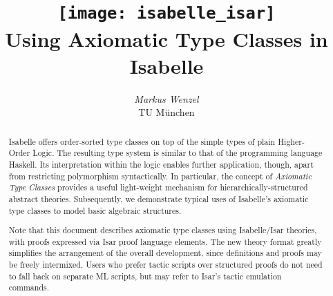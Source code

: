 \documentclass[12pt,a4paper,fleqn]{report}
\title{\texttt{[image: isabelle\_isar]}
  \\[4ex] Using Axiomatic Type Classes in Isabelle}
\author{\emph{Markus Wenzel} \\ TU M\"unchen}
\begin{document}
\underscoreoff

\maketitle 

\begin{abstract}
  Isabelle offers order-sorted type classes on top of the simple types of
  plain Higher-Order Logic.  The resulting type system is similar to that of
  the programming language Haskell.  Its interpretation within the logic
  enables further application, though, apart from restricting polymorphism
  syntactically.  In particular, the concept of \emph{Axiomatic Type Classes}
  provides a useful light-weight mechanism for hierarchically-structured
  abstract theories. Subsequently, we demonstrate typical uses of Isabelle's
  axiomatic type classes to model basic algebraic structures.
  
  Note that this document describes axiomatic type classes using Isabelle/Isar
  theories, with proofs expressed via Isar proof language elements.  The new
  theory format greatly simplifies the arrangement of the overall development,
  since definitions and proofs may be freely intermixed.  Users who prefer
  tactic scripts over structured proofs do not need to fall back on separate
  ML scripts, but may refer to Isar's tactic emulation commands.
\end{abstract}


 \tableofcontents \clearfirst



\nocite{nipkow-types93}
\nocite{nipkow-sorts93}
\nocite{Wenzel:1997:TPHOL}
\nocite{paulson-isa-book}
\nocite{isabelle-isar-ref}
\nocite{Wenzel:1999:TPHOL}

\begingroup
   \small\raggedright\frenchspacing
  
\endgroup
\end{document}
